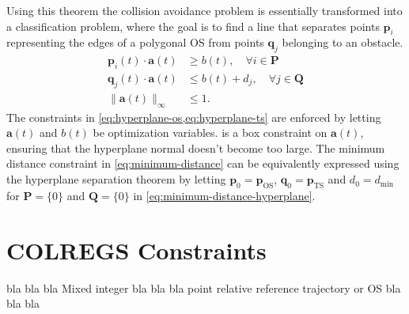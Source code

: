 Using this theorem the collision avoidance problem is essentially transformed into a classification problem, where the goal is to find a line that separates points $\mathbf p_i$ representing the edges of a polygonal OS from points $\mathbf q_j$ belonging to an obstacle.
\begin{subequations}\label{eq:minimum-distance-hyperplane}
    \begin{align}
        \mathbf p_{i}(t) \cdot{\mathbf a}(t) &\ge b(t), \quad\forall i\in\mathbf P
        \label{eq:hyperplane-os} \\
        \mathbf q_{j}(t) \cdot{\mathbf a}(t) &\le b(t) + d_{j}, \quad\forall j\in\mathbf Q
        \label{eq:hyperplane-ts} \\
        \|{\mathbf a}(t)\|_\infty &\le 1.
        \label{eq:hyperplane-norm}
    \end{align}
\end{subequations}
The constraints in \cref{eq:hyperplane-os,eq:hyperplane-ts} are enforced by
letting $\mathbf a(t)$ and $b(t)$ be optimization variables.  is a box constraint on $\mathbf a(t)$, ensuring that the hyperplane normal doesn't become too large. The minimum distance constraint in \cref{eq:minimum-distance} can be equivalently expressed using the hyperplane separation theorem by letting $\mathbf p_0 = \mathbf p_{\text{OS}}$, $\mathbf q_0 = \mathbf p_{\text{TS}}$ and $d_0 = d_{\text{min}}$ for $\mathbf P = \{0\}$ and $\mathbf Q = \{0\}$ in \cref{eq:minimum-distance-hyperplane}.

\section{COLREGS Constraints}

bla bla bla Mixed integer bla bla bla point relative reference trajectory or OS bla bla bla
